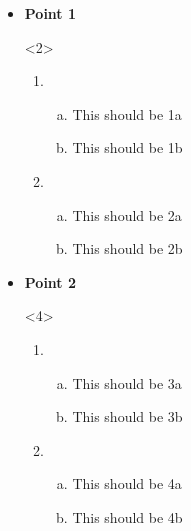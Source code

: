 \documentclass[12pt]{beamer}
\newcounter{myenumi}
\begin{document}
\begin{frame}[t]
  \setcounter{myenumi}{0}
  \begin{itemize}
    \item<1-> \textbf{Point 1} 
      \begin{onlyenv}<2>
        \begin{enumerate}[(1)]
          \setcounter{enumi}{\value{myenumi}}
          \item \begin{enumerate}[a.]
                  \item This should be 1a
                  \item This should be 1b
                \end{enumerate}
          \item \begin{enumerate}[a.]
                  \item This should be 2a
                  \item This should be 2b
                \end{enumerate}
          \setcounter{myenumi}{\value{enumi}}
        \end{enumerate}
      \end{onlyenv}
    \item<3-> \textbf{Point 2} 
      \begin{onlyenv}<4>
        \begin{enumerate}[(1)]
          \setcounter{enumi}{\value{myenumi}}
          \item \begin{enumerate}[a.]
                  \item This should be 3a
                  \item This should be 3b
                \end{enumerate}
          \item \begin{enumerate}[a.]
                  \item This should be 4a
                  \item This should be 4b
                \end{enumerate}
          \setcounter{myenumi}{\value{enumi}}
        \end{enumerate}
      \end{onlyenv}  
    \end{itemize}

\end{frame}
\end{document}
